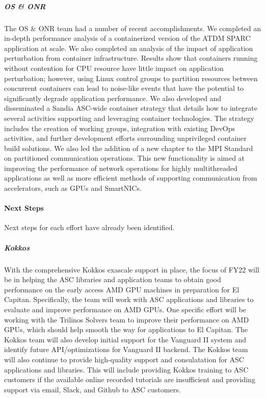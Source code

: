 \subparagraph{OS \& ONR} The OS \& ONR team had a number of recent accomplishments. We completed an in-depth performance analysis of a containerized version of the ATDM SPARC application at scale. We also completed an analysis of the impact of application perturbation from container infrastructure. Results show that containers running without contention for CPU resource have little impact on application perturbation; however, using Linux control groups to partition resources between concurrent containers can lead to noise-like events that have the potential to significantly degrade application performance. We also developed and disseminated a Sandia ASC-wide container strategy that details how to integrate several activities supporting and leveraging container technologies. The strategy includes the creation of working groups, integration with existing DevOps activities, and further development efforts surrounding unprivileged container build solutions. We also led the addition of a new chapter to the MPI Standard on partitioned communication operations. This new functionality is aimed at improving the performance of network operations for highly multithreaded applications as well as more efficient methods of supporting communication from accelerators, such as GPUs and SmartNICs.


\paragraph{Next Steps} %
Next steps for each effort have already been identified.

\subparagraph{Kokkos} With the comprehensive Kokkos exascale support in place, the focus of FY22 will be in helping the ASC libraries and application teams to obtain good performance on the early access AMD GPU machines in preparation for El Capitan.  Specifically, the team will work with ASC applications and libraries to evaluate and improve performance on AMD GPUs.  One specific effort will be working with the Trilinos Solvers team to improve their performance on AMD GPUs, which should help smooth the way for applications to El Capitan.  The Kokkos team will also develop initial support for the Vanguard II system and identify future API/optimizations for Vanguard II backend.  The Kokkos team will also continue to provide high-quality support and consulatation for ASC applications and libraries.  This will include providing Kokkos training to ASC customers if the available online recorded tutorials are insufficient and providing support via email, Slack, and Github to ASC customers.

